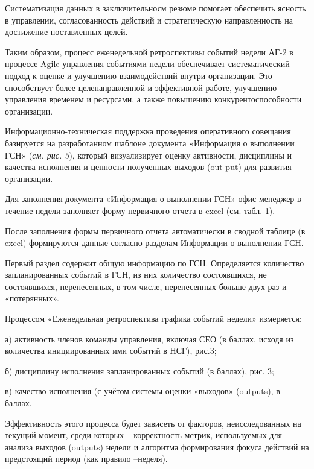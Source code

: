 \begin{multicols}{2}
Систематизация данных в заключительносм резюме помогает обеспечить
ясность в управлении, согласованность действий и стратегическую
направленность на достижение поставленных целей.

Таким образом, процесс еженедельной ретроспективы событий недели АГ-2 в
процессе Agile-управления событиями недели обеспечивает систематический
подход к оценке и улучшению взаимодействий внутри организации. Это
способствует более целенаправленной и эффективной работе, улучшению
управления временем и ресурсами, а также повышению конкурентоспособности
организации.

Информационно-техническая поддержка проведения оперативного совещания
базируется на разработанном шаблоне документа «Информация о выполнении
ГСН» (\emph{см. рис. 3}), который визуализирует оценку активности,
дисциплины и качества исполнения и ценности полученных выходов (out-put)
для развития организации.


Для заполнения документа «Информация о выполнении ГСН» офис-менеджер в
течение недели заполняет форму первичного отчета в excel (см. табл. 1).

После заполнения формы первичного отчета автоматически в сводной таблице
(в excel) формируются данные согласно разделам Информации о выполнении
ГСН.

Первый раздел содержит общую информацию по ГСН. Определяется количество
запланированных событий в ГСН, из них количество состоявшихся, не
состоявшихся, перенесенных, в том числе, перенесенных больше двух раз и
«потерянных».

Процессом «Еженедельная ретроспектива графика событий недели»
измеряется:

а) активность членов команды управления, включая СЕО (в баллах, исходя
из количества инициированных ими событий в НСГ), рис.3;

б) дисциплину исполнения запланированных событий (в баллах), рис. 3;

в) качество исполнения (с учётом системы оценки «выходов» (outputs), в
баллах.

Эффективность этого процесса будет зависеть от факторов, неисследованных
на текущий момент, среди которых -- корректность метрик, используемых
для анализа выходов (outputs) недели и алгоритма формирования фокуса
действий на предстоящий период (как правило --неделя).
\end{multicols}

